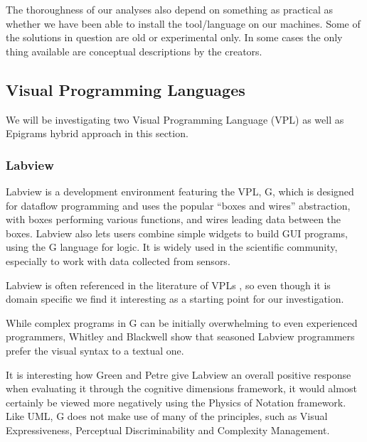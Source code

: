 The thoroughness of our analyses also depend on something as practical as whether we have been able to install the tool/language on our machines. Some of the solutions in question are old or experimental only. In some cases the only thing available are conceptual descriptions by the
creators.

\subsection{Visual Programming Languages}
We will be investigating two Visual Programming Language (VPL) as well as Epigrams hybrid approach in this section.


\subsubsection{Labview}
\label{subsub:Labview}
Labview is a development environment featuring the VPL, G, which is designed for dataflow programming and uses the popular ``boxes and wires'' abstraction, with boxes performing various functions, and wires leading data between the boxes. Labview also lets users combine simple widgets to build GUI programs, using the G language for logic. It is widely used in the scientific community, especially to work with data collected from sensors.

Labview is often referenced in the literature of VPLs , so even though it is domain specific we find it interesting as a starting point for our investigation.

While complex programs in G can be initially overwhelming to even experienced programmers, Whitley and Blackwell  show that seasoned Labview programmers prefer the visual syntax to a textual one.

It is interesting how Green and Petre  give Labview an overall positive response when evaluating it through the cognitive dimensions framework, it would almost certainly be viewed more negatively using the Physics of Notation framework. Like UML, G does not make use of many of the principles, such as Visual Expressiveness, Perceptual Discriminability and Complexity Management.

